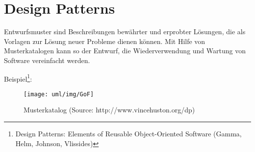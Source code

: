 \newpage
\chapter{Design Patterns}
Entwurfsmuster sind Beschreibungen bewährter und erprobter Lösungen,
die als Vorlagen zur Lösung neuer Probleme
dienen können. Mit Hilfe von Musterkatalogen
kann so der Entwurf, die Wiederverwendung und Wartung von
Software vereinfacht werden.

\newslide
Beispiel\footnote{Design Patterns: Elements of Reusable Object-Oriented
  Software (Gamma, Helm, Johnson, Vlissides)}:
\begin{figure}[H]
\begin{center}
\texttt{[image: uml/img/GoF]}
\caption{Musterkatalog (Source: http://www.vincehuston.org/dp)}
\end{center}
\end{figure}
\newslide
